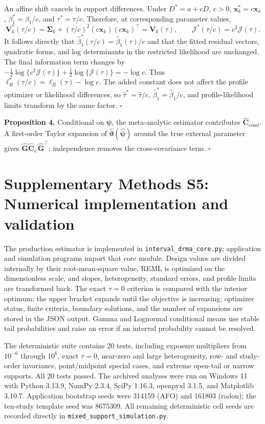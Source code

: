 \documentclass[11pt]{article}
\begin{document}
An affine shift cancels in support differences. Under $D^*=a+cD$, $c>0$,
$\mathbf x_k^*=c\mathbf x_k$, $\beta_1^*=\beta_1/c$, and
$\tau^*=\tau/c$. Therefore, at corresponding parameter values,
\[
 \mathbf V_k^*(\tau/c)=\boldsymbol\Sigma_k+
 (\tau/c)^2(c\mathbf x_k)(c\mathbf x_k)^\top=\mathbf V_k(\tau),
 \qquad
 \mathcal J^*(\tau/c)=c^2\mathcal J(\tau).
\]
It follows directly that
$\widehat\beta_1^*(\tau/c)=\widehat\beta_1(\tau)/c$ and that the fitted residual
vectors, quadratic forms, and log determinants in the restricted likelihood
are unchanged. The final information term changes by
$-\tfrac12\log\{c^2\mathcal J(\tau)\}+
\tfrac12\log\{\mathcal J(\tau)\}=-\log c$. Thus
$\ell_R^*(\tau/c)=\ell_R(\tau)-\log c$. The added constant does not affect the
profile optimizer or likelihood differences, so
$\widehat\tau^*=\widehat\tau/c$,
$\widehat\beta_1^*=\widehat\beta_1/c$, and profile-likelihood limits transform
by the same factor. \hfill$\square$

\noindent\textbf{Proposition 4.}
Conditional on $\boldsymbol\psi$, the meta-analytic estimator contributes
$\widehat{\mathbf C}_{\mathrm{cond}}$. A first-order Taylor expansion of
$\widehat{\boldsymbol\vartheta}(\widehat{\boldsymbol\psi})$ around the true
external parameter gives
$\widehat{\mathbf G}\widehat{\mathbf C}_{\psi}\widehat{\mathbf G}^{\top}$;
independence removes the cross-covariance term. \hfill$\square$

\section*{Supplementary Methods S5: Numerical implementation and validation}

The production estimator is implemented in \texttt{interval\_drma\_core.py};
application and simulation programs import that core module. Design values are
divided internally by their root-mean-square value, REML is optimized on the
dimensionless scale, and slopes, heterogeneity, standard errors, and profile
limits are transformed back. The exact $\tau=0$ criterion is compared with the
interior optimum; the upper bracket expands until the objective is increasing;
optimizer status, finite criteria, boundary solutions, and the number of
expansions are stored in the JSON output. Gamma and Lognormal conditional means
use stable tail probabilities and raise an error if an interval probability
cannot be resolved.

The deterministic suite contains 20 tests, including exposure multipliers from
$10^{-6}$ through $10^6$, exact $\tau=0$, near-zero and large heterogeneity,
row- and study-order invariance, point/midpoint special cases, and extreme
open-tail or narrow supports. All 20 tests passed. The archived analyses were
run on Windows 11 with Python 3.13.9, NumPy 2.3.4, SciPy 1.16.3,
openpyxl 3.1.5, and Matplotlib 3.10.7. Application bootstrap seeds were 314159 (AFO) and 161803
(radon); the ten-study template seed was 8675309. All remaining deterministic
cell seeds are recorded directly in \texttt{mixed\_support\_simulation.py}.
\end{document}
